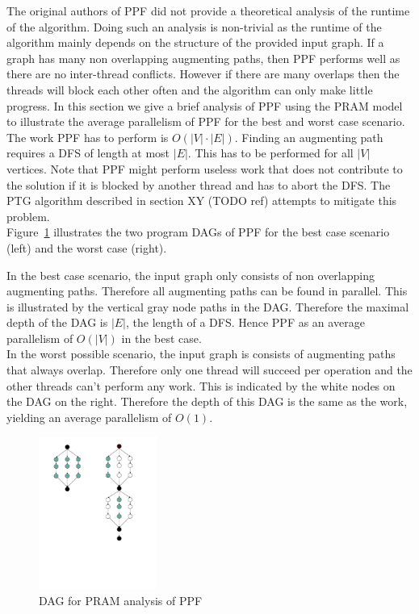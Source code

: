 \documentclass[letterpaper]{article}
\begin{document}
The original authors of PPF did not provide a theoretical analysis of the runtime of the algorithm.
Doing such an analysis is non-trivial as the runtime of the algorithm mainly depends on the structure of the provided
input graph. If a graph has many non overlapping augmenting paths, then PPF performs well as there are no inter-thread conflicts. 
However if there are many overlaps then the threads will block each other often and the algorithm can only make little progress.
In this section we give a brief analysis of PPF using the PRAM model to illustrate the average parallelism of PPF for the best and worst case
scenario. \\

The work PPF has to perform is $O(|V|\cdot|E|)$. Finding an augmenting path requires a DFS of length at most $|E|$. 
This has to be performed for all $|V|$ vertices. Note that PPF might perform useless work that does not contribute to the solution
if it is blocked by another thread and has to abort the DFS. 
The PTG algorithm described in section XY (TODO ref) attempts to mitigate this problem.\\

Figure~\ref{fig:pram} illustrates the two program DAGs of PPF for the best case scenario (left) and the worst case (right).

In the best case scenario, the input graph only consists of non overlapping augmenting paths. 
Therefore all augmenting paths can be found in parallel. This is illustrated by the vertical gray node paths in the DAG.
Therefore the maximal depth of the DAG is $|E|$, the length of a DFS. Hence PPF as an average parallelism of $O(|V|)$ in the best case.\\

In the worst possible scenario, the input graph is consists of augmenting paths that always overlap. 
Therefore only one thread will succeed per operation and the other threads can't perform any work. This is indicated by the white nodes on
the DAG on the right. Therefore the depth of this DAG is the same as the work, yielding an average parallelism of $O(1)$.\\

\begin{figure}
    \begin{center}
  \includegraphics[height=5cm, trim={2.5cm 8cm 4cm 1cm}, clip]{PRAM.pdf}
  \end{center}
  \caption{DAG for PRAM analysis of PPF}
  \label{fig:pram}
\end{figure}
\end{document}
